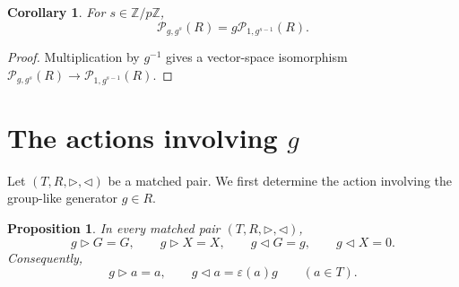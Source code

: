 \documentclass[twoside,11pt]{amsart}
\newtheorem{pro}[defi]{Proposition}
\newtheorem{cor}[defi]{Corollary}
\newcommand{\Z}{\mathbb{Z}}
\newcommand{\Pp}{\mathcal{P}}
\begin{document}
	
	
	\begin{cor}\label{cor:shifted-R}
		For $s\in\Z/p\Z$,
		\[
		\Pp_{g,g^s}(R)=g\Pp_{1,g^{s-1}}(R).
		\]
	\end{cor}
	
	\begin{proof}
		Multiplication by $g^{-1}$ gives a vector-space isomorphism
		$\Pp_{g,g^s}(R)\to\Pp_{1,g^{s-1}}(R)$.
	\end{proof}
	
	\section{The actions involving \texorpdfstring{$g$}{g}}\label{sec:first}
	
	Let $(T,R,\triangleright,\triangleleft)$ be a matched pair. We first determine
	the action involving the group-like generator $g\in R$.
	
	\begin{pro}\label{prop:first}
		In every matched pair $(T,R,\triangleright,\triangleleft)$,
		\[
		g\triangleright G=G,\qquad g\triangleright X=X,
		\qquad g\triangleleft G=g,\qquad g\triangleleft X=0.
		\]
		Consequently,
		\[
		g\triangleright a=a,
		\qquad
		g\triangleleft a=\varepsilon(a)g
		\qquad(a\in T).
		\]
	\end{pro}
	
\end{document}
